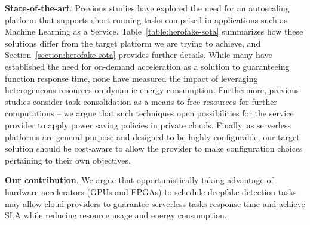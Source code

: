 

\textbf{State-of-the-art}. Previous studies have explored the need for an autoscaling platform that supports short-running tasks comprised in applications such as Machine Learning as a Service. Table~\ref{table:herofake-sota} summarizes how these solutions differ from the target platform we are trying to achieve, and Section~\ref{section:herofake-sota} provides further details. While many have established the need for on-demand acceleration as a solution to guaranteeing function response time, none have measured the impact of leveraging heterogeneous resources on dynamic energy consumption. Furthermore, previous studies consider task consolidation as a means to free resources for further computations -- we argue that such techniques open possibilities for the service provider to apply power saving policies in private clouds. Finally, as serverless platforms are general purpose and designed to be highly configurable, our target solution should be cost-aware to allow the provider to make configuration choices pertaining to their own objectives.


\textbf{Our contribution}. We argue that opportunistically taking advantage of hardware accelerators (GPUs and FPGAs) to schedule deepfake detection tasks may allow cloud providers to guarantee serverless tasks response time and achieve SLA while reducing resource usage and energy consumption.

